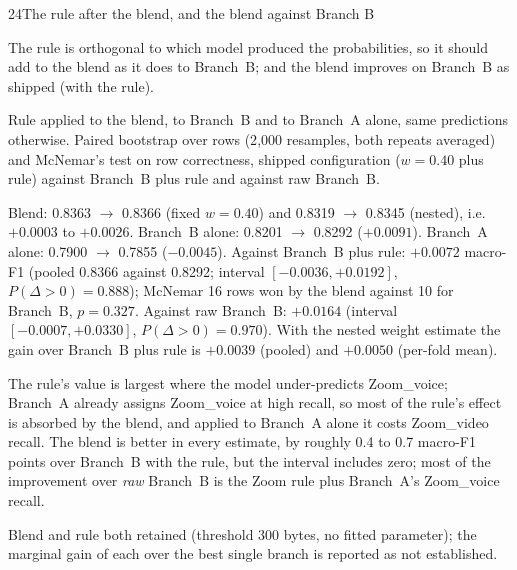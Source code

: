 \begin{explog}{24}{The rule after the blend, and the blend against Branch B}
\item[Hypothesis] The rule is orthogonal to which model produced the probabilities, so it
should add to the blend as it does to Branch~B; and the blend improves on Branch~B as
shipped (with the rule).
\item[Method] Rule applied to the blend, to Branch~B and to Branch~A alone, same predictions
otherwise. Paired bootstrap over rows (2{,}000 resamples, both repeats averaged) and
McNemar's test on row correctness, shipped configuration ($w=0.40$ plus rule)
against Branch~B plus rule and against raw Branch~B.
\item[Result] Blend: 0.8363 $\rightarrow$ 0.8366 (fixed $w=0.40$) and 0.8319 $\rightarrow$
0.8345 (nested), i.e.\ $+0.0003$ to $+0.0026$. Branch~B alone: 0.8201 $\rightarrow$
0.8292 ($+0.0091$). Branch~A alone: 0.7900 $\rightarrow$ 0.7855 ($-0.0045$). Against
Branch~B plus rule: $+0.0072$ macro-F1 (pooled 0.8366 against 0.8292; interval
$[-0.0036,+0.0192]$, $P(\Delta>0)=0.888$); McNemar 16 rows won by the blend against
10 for Branch~B, $p=0.327$. Against raw Branch~B: $+0.0164$ (interval
$[-0.0007,+0.0330]$, $P(\Delta>0)=0.970$). With the nested weight estimate the gain
over Branch~B plus rule is $+0.0039$ (pooled) and $+0.0050$ (per-fold mean).
\item[Inference] The rule's value is largest where the model under-predicts Zoom\_voice;
Branch~A already assigns Zoom\_voice at high recall, so most of the rule's effect is
absorbed by the blend, and applied to Branch~A alone it costs Zoom\_video recall. The
blend is better in every estimate, by roughly 0.4 to 0.7 macro-F1 points over
Branch~B with the rule, but the interval includes zero; most of the improvement over
\emph{raw} Branch~B is the Zoom rule plus Branch~A's Zoom\_voice recall.
\item[Verdict] Blend and rule both retained (threshold 300 bytes, no fitted parameter);
the marginal gain of each over the best single branch is reported as not established.
\end{explog}

